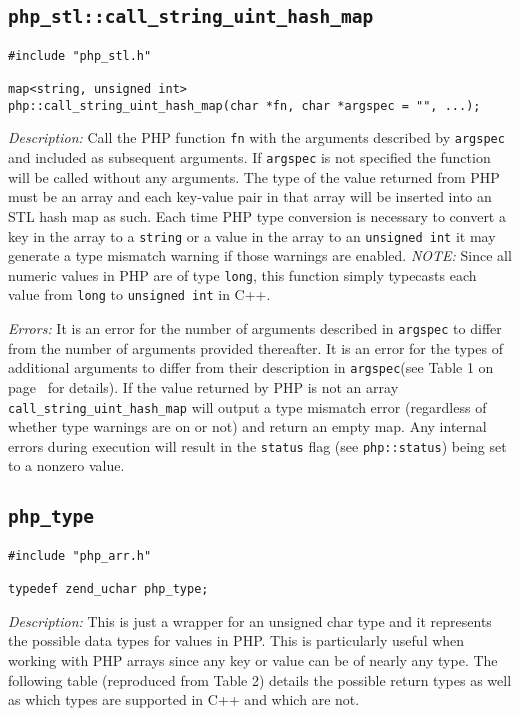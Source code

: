 \documentclass[11pt,titlepage]{article}
\begin{document}
\subsection{\texttt{php\_stl::call\_string\_uint\_hash\_map}}

\begin{verbatim}
#include "php_stl.h"

map<string, unsigned int>
php::call_string_uint_hash_map(char *fn, char *argspec = "", ...);
\end{verbatim}

\emph{Description:} Call the PHP function \verb|fn| with the arguments described by \verb|argspec| and included as subsequent arguments. If \verb|argspec| is not specified the function will be called without any arguments. The type of the value returned from PHP must be an array and each key-value pair in that array will be inserted into an STL hash map as such. Each time PHP type conversion is necessary to convert a key in the array to a \verb|string| or a value in the array to an \verb|unsigned int| it may generate a type mismatch warning if those warnings are enabled. \emph{NOTE:} Since all numeric values in PHP are of type \verb|long|, this function simply typecasts each value from \verb|long| to \verb|unsigned int| in C++.

\emph{Errors:} It is an error for the number of arguments described in \verb|argspec| to differ from the number of arguments provided thereafter. It is an error for the types of additional arguments to differ from their description in \verb|argspec|(see Table 1 on page~\pageref{Table1} for details). If the value returned by PHP is not an array \verb|call_string_uint_hash_map| will output a type mismatch error (regardless of whether type warnings are on or not) and return an empty map. Any internal errors during execution will result in the \verb|status| flag (see \verb|php::status|) being set to a nonzero value.


\subsection{\texttt{php\_type}}

\begin{verbatim}
#include "php_arr.h"

typedef zend_uchar php_type;
\end{verbatim}

\emph{Description:} This is just a wrapper for an unsigned char type and it represents the possible data types for values in PHP. This is particularly useful when working with PHP arrays since any key or value can be of nearly any type. The following table (reproduced from Table 2) details the possible return types as well as which types are supported in C++ and which are not.
\end{document}
